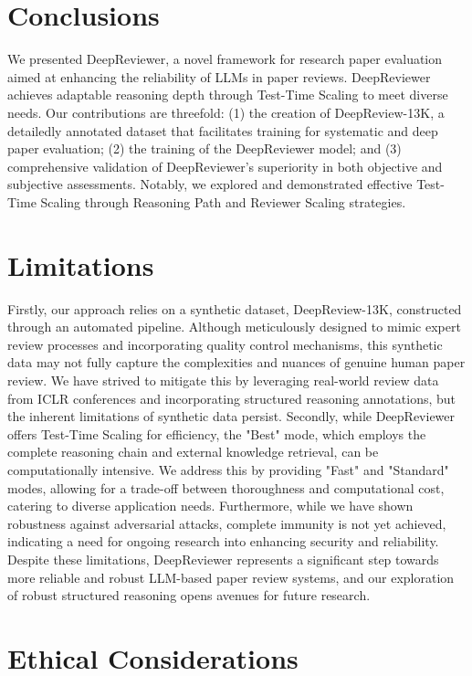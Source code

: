 \documentclass{article}
\begin{document}
\section{Conclusions}
We presented DeepReviewer, a novel framework for research paper evaluation aimed at enhancing the reliability of LLMs in paper reviews. DeepReviewer achieves adaptable reasoning depth through Test-Time Scaling to meet diverse needs. Our contributions are threefold: (1) the creation of DeepReview-13K, a detailedly annotated dataset that facilitates training for systematic and deep paper evaluation; (2) the training of the DeepReviewer model; and (3) comprehensive validation of DeepReviewer's superiority in both objective and subjective assessments. Notably, we explored and demonstrated effective Test-Time Scaling through Reasoning Path and Reviewer Scaling strategies. 


\section*{Limitations}
Firstly, our approach relies on a synthetic dataset, DeepReview-13K, constructed through an automated pipeline. Although meticulously designed to mimic expert review processes and incorporating quality control mechanisms, this synthetic data may not fully capture the complexities and nuances of genuine human paper review. We have strived to mitigate this by leveraging real-world review data from ICLR conferences and incorporating structured reasoning annotations, but the inherent limitations of synthetic data persist. Secondly, while DeepReviewer offers Test-Time Scaling for efficiency, the "Best" mode, which employs the complete reasoning chain and external knowledge retrieval, can be computationally intensive. We address this by providing "Fast" and "Standard" modes, allowing for a trade-off between thoroughness and computational cost, catering to diverse application needs. Furthermore, while we have shown robustness against adversarial attacks, complete immunity is not yet achieved, indicating a need for ongoing research into enhancing security and reliability. Despite these limitations, DeepReviewer represents a significant step towards more reliable and robust LLM-based paper review systems, and our exploration of robust structured reasoning opens avenues for future research.

\section*{Ethical Considerations}
\end{document}
